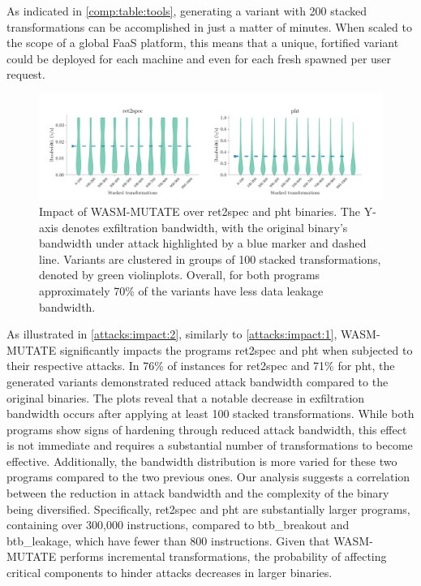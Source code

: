 \begin{tcolorbox}[title=Takeaway,boxrule=1pt,arc=.2em,boxsep=1.0mm]
    As indicated in \autoref{comp:table:tools}, generating a variant with 200 stacked transformations can be accomplished in just a matter of minutes.
    When scaled to the scope of a global FaaS platform, this means that a unique, fortified variant could be deployed for each machine and even for each fresh \Wasm spawned per user request.
\end{tcolorbox}






\begin{figure}[h]
    \centering    
    \includegraphics[width=\linewidth]{plots/spectre/results.rq3.2.pdf}
    \caption{Impact of WASM-MUTATE over ret2spec and pht binaries. The Y-axis denotes exfiltration bandwidth, with the original binary's bandwidth under attack highlighted by a blue marker and dashed line. Variants are clustered in groups of 100 stacked transformations, denoted by green violinplots. 
    Overall, for both programs approximately 70\% of the variants have less data leakage bandwidth.}
  \label{attacks:impact:2}
\end{figure}


As illustrated in \autoref{attacks:impact:2}, similarly to \autoref{attacks:impact:1}, WASM-MUTATE significantly impacts the programs ret2spec and pht when subjected to their respective attacks. 
In 76\% of instances for ret2spec and 71\% for pht, the generated variants demonstrated reduced attack bandwidth compared to the original binaries.
The plots reveal that a notable decrease in exfiltration bandwidth occurs after applying at least 100 stacked transformations. 
While both programs show signs of hardening through reduced attack bandwidth, this effect is not immediate and requires a substantial number of transformations to become effective. 
Additionally, the bandwidth distribution is more varied for these two programs compared to the two previous ones.
Our analysis suggests a correlation between the reduction in attack bandwidth and the complexity of the binary being diversified. 
Specifically, ret2spec and pht are substantially larger programs, containing over 300,000 instructions, compared to btb\_breakout and btb\_leakage, which have fewer than 800 instructions. 
Given that WASM-MUTATE performs incremental transformations, the probability of affecting critical components to hinder attacks decreases in larger binaries.

